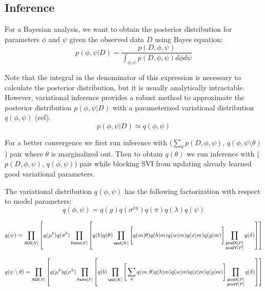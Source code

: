 \subsection*{Inference}

For a Bayesian analysis, we want to obtain the posterior distribution for parameters $\phi$ and $\psi$ given the observed data $D$ using Bayes equation:
%
\begin{equation}
    p(\phi, \psi | D) =
    \dfrac{p(D, \phi, \psi)}{\int_{\phi, \psi} p(D, \phi, \psi) d\phi d\psi}
\end{equation}

Note that the integral in the denominator of this expression is necessary to calculate the posterior distribution, but it is usually analytically intractable. However, variational inference provides a robust method to approximate the posterior distribution $p(\phi, \psi | D)$ with a parameterized variational distribution $q(\phi, \psi)$ (ref).
%
\begin{equation}
    p(\phi, \psi | D) \simeq q(\phi, \psi)
\end{equation}

For a better convergence we first run inference with ($\sum_\theta p(D, \phi, \psi)$, $q(\phi, \psi \setminus \theta)$) pair where $\theta$ is marginalized out. Then to obtain $q(\theta)$ we run inference with ($p(D, \phi, \psi)$, $q(\phi, \psi)$) pair while blocking SVI from updating already learned good variational parameters.

The variational distribution $q(\phi, \psi)$ has the following factorization with respect to model parameters:
%
\begin{equation}
    q(\phi, \psi) = q(g) q(\sigma^{xy}) q(\pi) q(\lambda) q(\psi)
\end{equation}

\begin{equation}
\begin{aligned}
    q(\psi) = \prod_{\mathsf{AOI}[N]} \left[ q(\mu^b) q(\sigma^b) \prod_{\mathsf{frame}[F]} \left[ \vphantom{\prod_{F}} q(b) q(\theta) \prod_{\mathsf{spot}[K]} \left[ \vphantom{\prod_{F}} q(m | \theta) q(h | m) q(w | m) q(x | m) q(y | m) \right] \prod_{\substack{\mathsf{pixelX}[P] \\ \mathsf{pixelY}[P]}} q(\delta) \right] \right]
\end{aligned}
\end{equation} 

\begin{equation}
\begin{aligned}
    q(\psi \setminus \theta) = \prod_{\mathsf{AOI}[N]} \left[ q(\mu^b) q(\sigma^b) \prod_{\mathsf{frame}[F]} \left[ \vphantom{\prod_{F}} q(b) \prod_{\mathsf{spot}[K]} \left[ \vphantom{\prod_{F}} \sum_\theta q(m, \theta) q(h | m) q(w | m) q(x | m) q(y | m) \right] \prod_{\substack{\mathsf{pixelX}[P] \\ \mathsf{pixelY}[P]}} q(\delta) \right] \right]
\end{aligned}
\end{equation}


